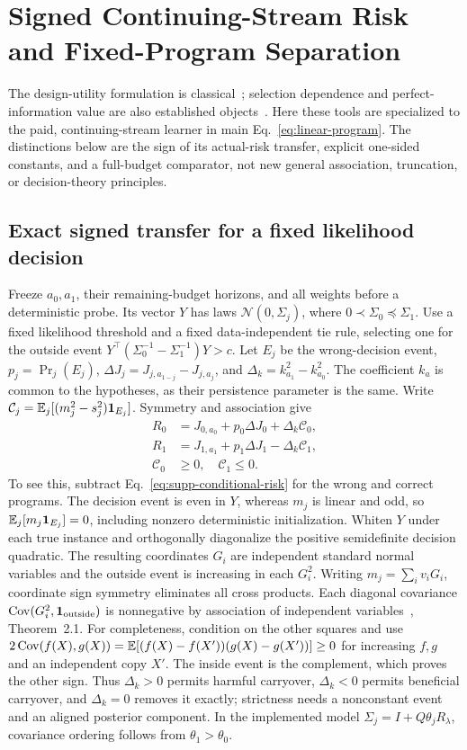 \section{Signed Continuing-Stream Risk and Fixed-Program Separation}
\label{sec:signed-mechanism}
The design-utility formulation is classical~; selection dependence and perfect-information value are also established objects~.
Here these tools are specialized to the paid, continuing-stream learner in main Eq.~\eqref{eq:linear-program}.
The distinctions below are the sign of its actual-risk transfer, explicit one-sided constants, and a full-budget comparator, not new general association, truncation, or decision-theory principles.

\subsection{Exact signed transfer for a fixed likelihood decision}
Freeze $a_0,a_1$, their remaining-budget horizons, and all weights before a deterministic probe.
Its vector $Y$ has laws $\mathcal N(0,\Sigma_j)$, where $0\prec\Sigma_0\preceq\Sigma_1$.
Use a fixed likelihood threshold and a fixed data-independent tie rule, selecting one for the outside event $Y^\top(\Sigma_0^{-1}-\Sigma_1^{-1})Y>c$.
Let $E_j$ be the wrong-decision event, $p_j=\Pr_j(E_j)$, $\Delta J_j=J_{j,a_{1-j}}-J_{j,a_j}$, and $\Delta_k=k_{a_1}^2-k_{a_0}^2$.
The coefficient $k_a$ is common to the hypotheses, as their persistence parameter is the same.
Write $\mathcal C_j=\mathbb E_j[(m_j^2-s_j^2)\mathbf1_{E_j}]$.
Symmetry and association give
\begin{align}
R_0&=J_{0,a_0}+p_0\Delta J_0+\Delta_k\mathcal C_0,\\
R_1&=J_{1,a_1}+p_1\Delta J_1-\Delta_k\mathcal C_1,\\
\mathcal C_0&\ge0,\quad\mathcal C_1\le0.
\label{eq:supp-signed-transfer}
\end{align}
To see this, subtract Eq.~\eqref{eq:supp-conditional-risk} for the wrong and correct programs.
The decision event is even in $Y$, whereas $m_j$ is linear and odd, so $\mathbb E_j[m_j\mathbf1_{E_j}]=0$, including nonzero deterministic initialization.
Whiten $Y$ under each true instance and orthogonally diagonalize the positive semidefinite decision quadratic.
The resulting coordinates $G_i$ are independent standard normal variables and the outside event is increasing in each $G_i^2$.
Writing $m_j=\sum_i v_iG_i$, coordinate sign symmetry eliminates all cross products.
Each diagonal covariance $\operatorname{Cov}(G_i^2,\mathbf1_{\rm outside})$ is nonnegative by association of independent variables~, Theorem~2.1.
For completeness, condition on the other squares and use $2\operatorname{Cov}(f(X),g(X))=\mathbb E[(f(X)-f(X'))(g(X)-g(X'))]\ge0$ for increasing $f,g$ and an independent copy $X'$.
The inside event is the complement, which proves the other sign.
Thus $\Delta_k>0$ permits harmful carryover, $\Delta_k<0$ permits beneficial carryover, and $\Delta_k=0$ removes it exactly; strictness needs a nonconstant event and an aligned posterior component.
In the implemented model $\Sigma_j=I+Q\theta_jR_\lambda$, covariance ordering follows from $\theta_1>\theta_0$.

